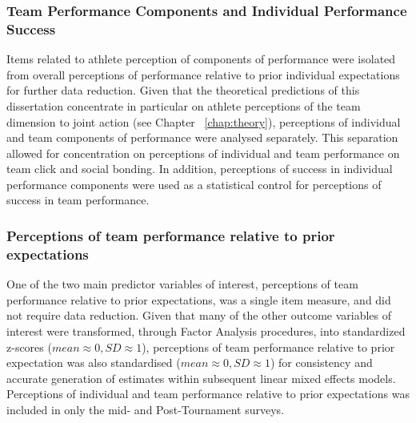 \begin{CJK}{UTF8}{gbsn}
\subsubsection{Team Performance Components and Individual Performance Success}
Items related to athlete perception of components of performance were isolated from overall perceptions of performance relative to prior individual expectations for further data reduction. Given that the theoretical predictions of this dissertation concentrate in particular on athlete perceptions of the team dimension to joint action (see Chapter ~\ref{chap:theory}), perceptions of individual and team components of performance were analysed separately.  This separation allowed for concentration on perceptions of individual and team performance on team click and social bonding. In addition, perceptions of success in individual performance components were used as a statistical control for perceptions of success in team performance.


\subsubsection{Perceptions of team performance relative to prior expectations}
One of the two main predictor variables of interest, perceptions of team performance relative to prior expectations, was a single item measure, and did not require data reduction.  Given that many of the other outcome variables of interest were transformed, through Factor Analysis procedures, into standardized z-scores ($mean \approx 0, SD \approx 1$), perceptions of team performance relative to prior expectation was also standardised ($mean \approx 0, SD \approx 1$) for consistency and accurate generation of estimates within subsequent linear mixed effects models.  Perceptions of individual and team performance relative to prior expectations was included in only the mid- and Post-Tournament surveys.
































\end{CJK}
